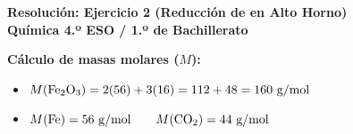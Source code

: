 ﻿\documentclass[11pt,a4paper]{article}
\begin{document}
\begin{center}
    {\LARGE \textbf{Resolución: Ejercicio 2 (Reducción de  en Alto Horno)}}\\[4pt]
    {\large \textbf{Química 4.º ESO / 1.º de Bachillerato}}
\end{center}

\vspace{0.4cm}
\noindent\textbf{Cálculo de masas molares ($M$):}
\begin{itemize}[leftmargin=1.5em, itemsep=2pt]
    \item $M(\ce{Fe2O3}) = 2(56) + 3(16) = 112 + 48 = 160\text{ g/mol}$
    \item $M(\ce{Fe}) = 56\text{ g/mol} \qquad M(\ce{CO2}) = 44\text{ g/mol}$
\end{itemize}
\end{document}
